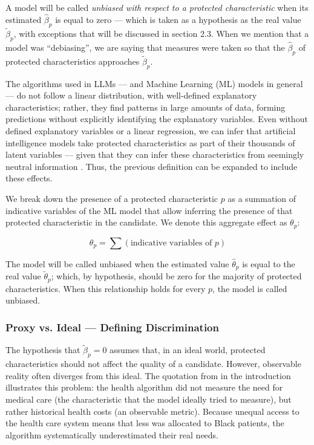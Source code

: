 \documentclass[12pt,a4paper]{article}
\begin{document}
A model will be called \textit{unbiased with respect to a protected characteristic}
when its estimated $\hat{\beta}_p$ is equal to zero --- which is taken
as a hypothesis as the real value $\tilde{\beta}_p$, with exceptions that will be discussed
in section 2.3. When we mention that a model was ``debiasing'',
we are saying that measures were taken so that the $\hat{\beta}_p$ of
protected characteristics approaches $\tilde{\beta}_p$.

The algorithms used in LLMs --- and Machine Learning (ML) models in
general --- do not follow a linear distribution, with well-defined
explanatory characteristics; rather, they find patterns in large
amounts of data, forming predictions without explicitly identifying
the explanatory variables. Even without defined explanatory variables or
a linear regression, we can infer that artificial intelligence models
take protected characteristics as part of their thousands
of latent variables --- given that they can infer these
characteristics from seemingly neutral information \citep{bai2024}. Thus, the previous definition can be expanded to include
these effects.

We break down the presence of a protected characteristic $p$ as a
summation of indicative variables of the ML model that allow inferring the
presence of that protected characteristic in the candidate. We denote this
aggregate effect as $\theta_p$:

\begin{equation}
\theta_p = \sum(\text{indicative variables of } p)
\end{equation}

The model will be called unbiased when the estimated value $\hat{\theta}_p$ is
equal to the real value $\tilde{\theta}_p$; which, by hypothesis, should be zero for the
majority of protected characteristics. When this relationship holds for
every $p$, the model is called unbiased.


\subsubsection{Proxy vs. Ideal --- Defining Discrimination}


The hypothesis that $\tilde{\beta}_p = 0$ assumes that, in an ideal world,
protected characteristics should not affect the quality of a
candidate. However, observable reality often diverges
from this ideal. The quotation from \citet{obermeyer2019} in the introduction illustrates
this problem: the health algorithm did not measure the need for medical
care (the characteristic that the model ideally tried to measure), but rather historical health
costs (an observable metric). Because unequal access to the health care system means that less was allocated to
Black patients, the algorithm systematically underestimated their
real needs.
\end{document}
